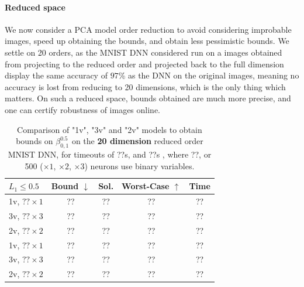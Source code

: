 \documentclass[letterpaper]{article} %
\begin{document}
\paragraph{Reduced space}

We now consider a PCA model order reduction to avoid considering improbable images, 
speed up obtaining the bounds, and obtain less pessimistic bounds.
We settle on 20 orders, as the MNIST DNN considered run on a images obtained from projecting to the reduced order and projected back to the full dimension 
display the same accuracy of $97$\% as the DNN on the original images, meaning no accuracy is lost from reducing to 20 dimensions, which is the only thing which matters. On such a reduced space, bounds obtained are much more precise, and one can certify robustness of images online.



	\begin{table}[h!]
	\begin{tabular}{|l|c|c|c|c|}\hline\hline
		$L_1\leq 0.5$ &        Bound $\downarrow$ &  Sol. &      Worst-Case $\uparrow$ &  Time \\\hline \hline
		
1v, $?? \times 1$ & ?? & ?? & ?? & ?? \\\hline 
		3v, $?? \times 3$ & ?? & ?? & ?? & ?? \\\hline 
	 2v, $?? \times 2$ & ?? & ?? & ?? & ?? \\\hline\hline
	 
		1v, $?? \times 1$ & ?? & ?? & ?? & ?? \\\hline 
		3v, $?? \times 3$ & ?? & ?? & ?? & ?? \\\hline 
	 2v, $?? \times 2$ & ?? & ?? & ?? & ?? \\\hline\hline
	 
	\end{tabular}
	\caption{Comparison of "1v", "3v" and "2v" models 
	to obtain bounds on $\beta^{0.5}_{0,1}$ on the {\bf 20 dimension}  reduced order MNIST DNN, for timeouts of ??s, and ??s , where ??,  or 500 ($\times 1$, $\times 2$, $\times 3$) neurons use binary variables.}
\end{table}
\end{document}
